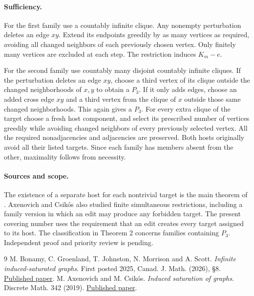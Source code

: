 \documentclass[10pt]{article}
\begin{document}
\paragraph{Sufficiency.} For the first family use a countably infinite clique. Any nonempty perturbation deletes an edge $xy$. Extend its endpoints greedily by as many vertices as required, avoiding all changed neighbors of each previously chosen vertex. Only finitely many vertices are excluded at each step. The restriction induces $K_m-e$.

For the second family use countably many disjoint countably infinite cliques. If the perturbation deletes an edge $xy$, choose a third vertex of its clique outside the changed neighborhoods of $x,y$ to obtain a $P_3$. If it only adds edges, choose an added cross edge $xy$ and a third vertex from the clique of $x$ outside those same changed neighborhoods. This again gives a $P_3$. For every extra clique of the target choose a fresh host component, and select its prescribed number of vertices greedily while avoiding changed neighbors of every previously selected vertex. All the required nonadjacencies and adjacencies are preserved. Both hosts originally avoid all their listed targets. Since each family has members absent from the other, maximality follows from necessity.

\paragraph{Sources and scope.} The existence of a separate host for each nontrivial target is the main theorem of \cite{bgjms}. Axenovich and Csik\'os \cite{ac} also studied finite simultaneous restrictions, including a family version in which an edit may produce any forbidden target. The present covering number uses the requirement that an edit creates every target assigned to its host. The classification in Theorem 2 concerns families containing $P_3$. Independent proof and priority review is pending.
\begin{thebibliography}{9}
 M. Bonamy, C. Groenland, T. Johnston, N. Morrison and A. Scott. \emph{Infinite induced-saturated graphs}. First posted 2025, Canad. J. Math. (2026), \S8. \href{https://doi.org/10.4153/S0008414X26102132}{Published paper}.
 M. Axenovich and M. Csik\'os. \emph{Induced saturation of graphs}. Discrete Math. 342 (2019). \href{https://doi.org/10.1016/j.disc.2019.01.006}{Published paper}.
\end{thebibliography}
\end{document}

